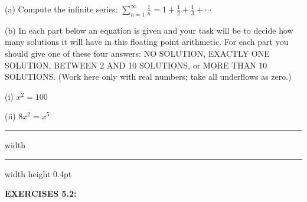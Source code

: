 \documentclass[../main.tex]{subfiles}
\begin{document}
(a) Compute the infinite series: $\sum_{n=1}^{\infty} \frac{1}{n}=1+\frac{1}{2}+\frac{1}{3}+\cdots$

(b) In each part below an equation is given and your task will be to decide how many solutions it will have in this floating point arithmetic. For each part you should give one of these four answers: NO SOLUTION, EXACTLY ONE SOLUTION, BETWEEN 2 AND 10 SOLUTIONS, or MORE THAN 10 SOLUTIONS. (Work here only with real numbers; take all underflows as zero.)

(i) $x^{2}=100$

(ii) $8 x^{2}=x^{5}$\\

\hrule width \hsize \kern 1pt \hrule width \hsize height 0.4pt

\hspace{0.1cm}

\textbf{EXERCISES 5.2: }
\end{document}
